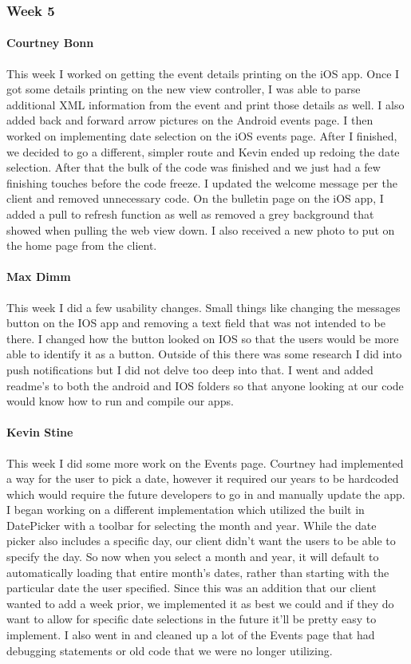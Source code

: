 		\subsubsection{Week 5}
		
			\paragraph{Courtney Bonn}
			This week I worked on getting the event details printing on the iOS app. Once I got some details printing on the new view controller, I was able to parse additional XML information from the event and print those details as well. I also added back and forward arrow pictures on the Android events page. I then worked on implementing date selection on the iOS events page. After I finished, we decided to go a different, simpler route and Kevin ended up redoing the date selection. After that the bulk of the code was finished and we just had a few finishing touches before the code freeze. I updated the welcome message per the client and removed unnecessary code. On the bulletin page on the iOS app, I added a pull to refresh function as well as removed a grey background that showed when pulling the web view down. I also received a new photo to put on the home page from the client.

			\paragraph{Max Dimm}
			This week I did a few usability changes. Small things like changing the messages button on the IOS app and removing a text field that was not intended to be there. I changed how the button looked on IOS so that the users would be more able to identify it as a button. Outside of this there was some research I did into push notifications but I did not delve too deep into that. I went and added readme's to both the android and IOS folders so that anyone looking at our code would know how to run and compile our apps.
			
			\paragraph{Kevin Stine}
			This week I did some more work on the Events page. Courtney had implemented a way for the user to pick a date, however it required our years to be hardcoded which would require the future developers to go in and manually update the app. I began working on a different implementation which utilized the built in DatePicker with a toolbar for selecting the month and year. While the date picker also includes a specific day, our client didn't want the users to be able to specify the day. So now when you select a month and year, it will default to automatically loading that entire month's dates, rather than starting with the particular date the user specified. Since this was an addition that our client wanted to add a week prior, we implemented it as best we could and if they do want to allow for specific date selections in the future it'll be pretty easy to implement. I also went in and cleaned up a lot of the Events page that had debugging statements or old code that we were no longer utilizing.
			
